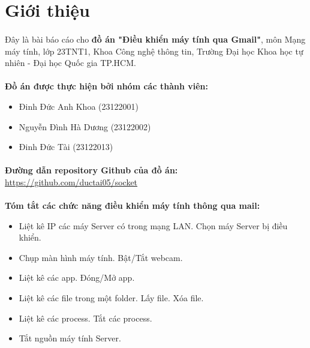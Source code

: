 \section{Giới thiệu}

\paragraph{}{Đây là bài báo cáo cho \textbf{đồ án "Điều khiển máy tính qua Gmail"}, môn Mạng máy tính, lớp 23TNT1, Khoa Công nghệ thông tin, Trường Đại học Khoa học tự nhiên - Đại học Quốc gia TP.HCM.}

\paragraph{}{\textbf{Đồ án được thực hiện bởi nhóm các thành viên:}}

\begin{itemize}
    \item Đinh Đức Anh Khoa (23122001)
    \item Nguyễn Đình Hà Dương (23122002)
    \item Đinh Đức Tài (23122013)
\end{itemize}

\paragraph{}{\textbf{Đường dẫn repository Github của đồ án:}} \href{https://github.com/ductai05/socket}{https://github.com/ductai05/socket} \cite{repo}

\paragraph{}{\textbf{Tóm tắt các chức năng điều khiển máy tính thông qua mail:}}

\begin{itemize}
    \item Liệt kê IP các máy Server có trong mạng LAN. Chọn máy Server bị điều khiển.
    \item Chụp màn hình máy tính. Bật/Tắt webcam.
    \item Liệt kê các app. Đóng/Mở app. 
    \item Liệt kê các file trong một folder. Lấy file. Xóa file.
    \item Liệt kê các process. Tắt các process.
    \item Tắt nguồn máy tính Server.
\end{itemize}

